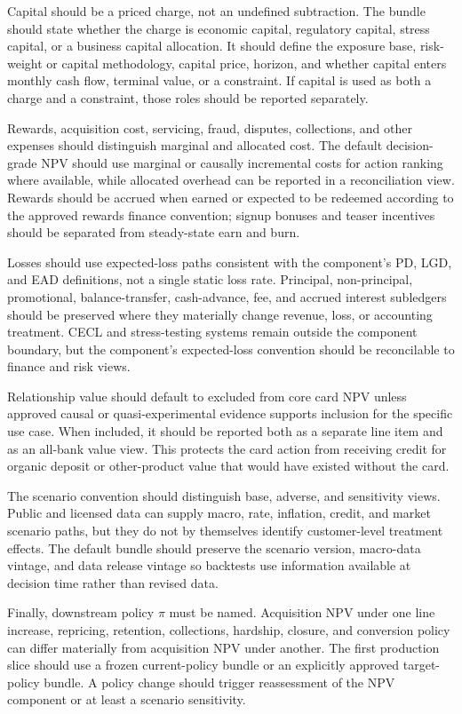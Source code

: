 \documentclass[11pt]{article}
\newcommand{\1}{\mathbf{1}}
\begin{document}
Capital should be a priced charge, not an undefined subtraction. The bundle
should state whether the charge is economic capital, regulatory capital,
stress capital, or a business capital allocation. It should define the exposure
base, risk-weight or capital methodology, capital price, horizon, and whether
capital enters monthly cash flow, terminal value, or a constraint. If capital
is used as both a charge and a constraint, those roles should be reported
separately.

Rewards, acquisition cost, servicing, fraud, disputes, collections, and other
expenses should distinguish marginal and allocated cost. The default
decision-grade NPV should use marginal or causally incremental costs for action
ranking where available, while allocated overhead can be reported in a
reconciliation view. Rewards should be accrued when earned or expected to be
redeemed according to the approved rewards finance convention; signup bonuses
and teaser incentives should be separated from steady-state earn and burn.

Losses should use expected-loss paths consistent with the component's PD, LGD,
and EAD definitions, not a single static loss rate. Principal,
non-principal, promotional, balance-transfer, cash-advance, fee, and accrued
interest subledgers should be preserved where they materially change revenue,
loss, or accounting treatment. CECL and stress-testing systems remain outside
the component boundary, but the component's expected-loss convention should be
reconcilable to finance and risk views.

Relationship value should default to excluded from core card NPV unless
approved causal or quasi-experimental evidence supports inclusion for the
specific use case. When included, it should be reported both as a separate
line item and as an all-bank value view. This protects the card action from
receiving credit for organic deposit or other-product value that would have
existed without the card.

The scenario convention should distinguish base, adverse, and sensitivity
views. Public and licensed data can supply macro, rate, inflation, credit, and
market scenario paths, but they do not by themselves identify customer-level
treatment effects. The default bundle should preserve the scenario version,
macro-data vintage, and data release vintage so backtests use information
available at decision time rather than revised data.

Finally, downstream policy $\pi$ must be named. Acquisition NPV under one line
increase, repricing, retention, collections, hardship, closure, and conversion
policy can differ materially from acquisition NPV under another. The first
production slice should use a frozen current-policy bundle or an explicitly
approved target-policy bundle. A policy change should trigger reassessment of
the NPV component or at least a scenario sensitivity.
\end{document}
